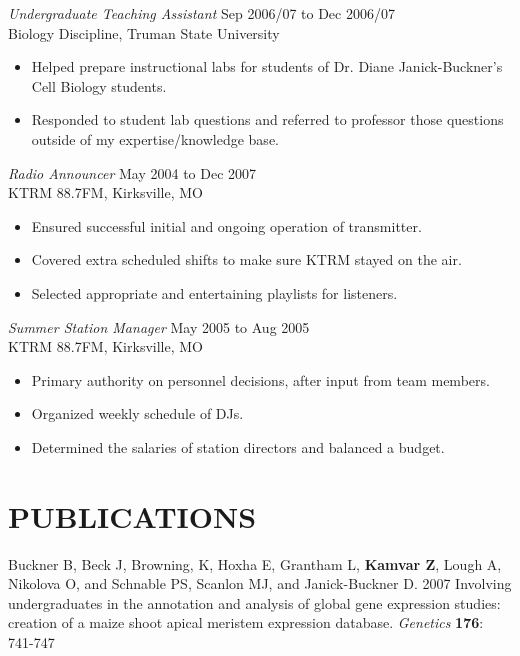 \documentclass[margin, 10pt]{res} %
\begin{document}
\begin{resume}
{\sl Undergraduate Teaching Assistant} \hfill Sep 2006/07 to Dec 2006/07 \\
Biology Discipline, Truman State University 
\begin{itemize} \itemsep -2pt %
\item Helped prepare instructional labs for students of Dr. Diane Janick-Buckner's Cell Biology students.
\item Responded to student lab questions and referred to professor those questions outside of my expertise/knowledge base.
\end{itemize} 

{\sl Radio Announcer} \hfill May 2004 to Dec 2007 \\
KTRM 88.7FM, Kirksville, MO 
\begin{itemize} \itemsep -2pt %
\item Ensured successful initial and ongoing operation of transmitter.
\item Covered extra scheduled shifts to make sure KTRM stayed on the air.
\item Selected appropriate and entertaining playlists for listeners.
\end{itemize}

{\sl Summer Station Manager} \hfill May 2005 to Aug 2005 \\
KTRM 88.7FM, Kirksville, MO 
\begin{itemize} \itemsep -2pt %
\item Primary authority on personnel decisions, after input from team members.
\item Organized weekly schedule of DJs.
\item Determined the salaries of station directors and balanced a budget.
\end{itemize}


\section{PUBLICATIONS}

Buckner B, Beck J, Browning, K, Hoxha E, Grantham L, \textbf{Kamvar Z}, Lough A, Nikolova O, and Schnable PS, Scanlon MJ, and Janick-Buckner D. 2007 Involving undergraduates in the annotation and analysis of global gene expression studies: creation of a maize shoot apical meristem expression database. \textit{Genetics} \textbf{176}: 741-747


\end{resume}
\end{document}
